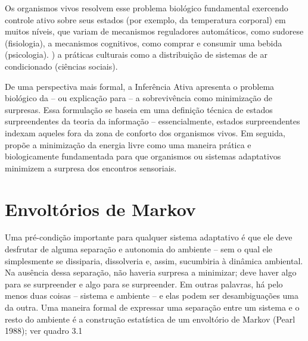 \documentclass[
  12pt,
]{book}
\begin{document}
Os organismos vivos resolvem esse problema biológico fundamental exercendo controle ativo sobre seus estados (por exemplo, da temperatura corporal) em muitos níveis, que variam de mecanismos reguladores automáticos, como sudorese (fisiologia), a mecanismos cognitivos, como comprar e consumir uma bebida (psicologia). ) a práticas culturais como a distribuição de sistemas de ar condicionado (ciências sociais).

De uma perspectiva mais formal, a Inferência Ativa apresenta o problema biológico da -- ou explicação para -- a sobrevivência como minimização de surpresas. Essa formulação se baseia em uma definição técnica de estados surpreendentes da teoria da informação -- essencialmente, estados surpreendentes indexam aqueles fora da zona de conforto dos organismos vivos. Em seguida, propõe a minimização da energia livre como uma maneira prática e biologicamente fundamentada para que organismos ou sistemas adaptativos minimizem a surpresa dos encontros sensoriais.

\hypertarget{envoltuxf3rios-de-markov}{%
\section{Envoltórios de Markov}\label{envoltuxf3rios-de-markov}}

Uma pré-condição importante para qualquer sistema adaptativo é que ele deve desfrutar de alguma separação e autonomia do ambiente -- sem o qual ele simplesmente se dissiparia, dissolveria e, assim, sucumbiria à dinâmica ambiental. Na ausência dessa separação, não haveria surpresa a minimizar; deve haver algo para se surpreender e algo para se surpreender. Em outras palavras, há pelo menos duas coisas -- sistema e ambiente -- e elas podem ser desambiguações uma da outra. Uma maneira formal de expressar uma separação entre um sistema e o resto do ambiente é a construção estatística de um envoltório de Markov (Pearl 1988); ver quadro 3.1
\end{document}
